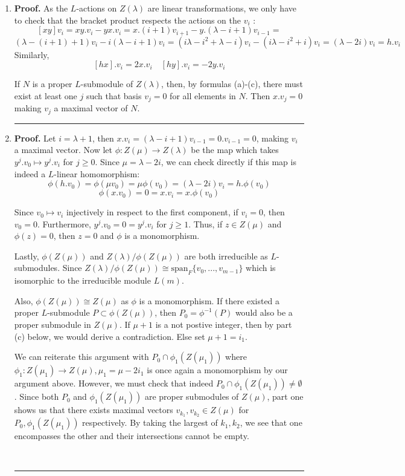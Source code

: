 \documentclass[12pt]{article}%
\newenvironment{proof}[1][Proof]{\textbf{#1.} }{\ \rule{0.5em}{0.5em}}
\begin{document}
\begin{enumerate}
  \item
  \begin{proof}
  As the $L$-actions on $Z(\lambda)$ are linear transformations, we only have to check that the bracket product respects the actions on the $v_i$ :
    $$
      [xy]v_i = xy.v_i - yx.v_i = x.(i+1)v_{i+1} - y.(\lambda - i + 1)v_{i-1} =  $$  $$
      (\lambda - (i+1) + 1)v_i - i(\lambda - i + 1)v_i = (i\lambda - i^2 + \lambda - i)v_i - (i\lambda - i^2 + i)v_i = (\lambda - 2i)v_i = h.v_i $$
    Similarly,
    $$ [hx].v_i = 2x.v_i \quad [hy].v_i = -2y.v_i $$

    If $N$ is a proper $L$-submodule of $Z(\lambda)$, then, by formulas (a)-(c), there must exist at least one $j$ such that basis $v_j = 0$ for all elements in $N$. Then $x.v_j = 0$ making $v_j$ a maximal vector of $N$.
  \end{proof}
  \item
  \begin{proof}
    Let $i = \lambda + 1$, then $x.v_i = (\lambda - i + 1)v_{i-1} = 0.v_{i-1} = 0$, making $v_i$ a maximal vector. Now let $\phi:Z(\mu) \rightarrow Z(\lambda)$ be the map which takes $y^j.v_0 \mapsto y^j.v_i$ for $j \geq 0$. Since $\mu = \lambda - 2i$, we can check directly if this map is indeed a $L$-linear homomorphism:
    $$\phi(h.v_0) = \phi(\mu v_0) = \mu \phi(v_0) = (\lambda - 2i)v_i = h.\phi(v_0) $$
    $$\phi(x.v_0) = 0 = x.v_i = x.\phi(v_0) $$

    Since $v_0 \mapsto v_i$ injectively in respect to the first component, if $v_i = 0$, then $v_0 = 0$. Furthermore, $y^j.v_0 = 0 = y^j.v_i$ for $j \geq 1$. Thus, if $z \in Z(\mu)$ and $\phi(z) = 0$, then $z = 0$ and $\phi$ is a monomorphism.

    Lastly, $\phi(Z(\mu))$ and $Z(\lambda)/\phi(Z(\mu))$ are both irreducible as $L$-submodules. Since $Z(\lambda)/\phi(Z(\mu)) \cong \text{span}_F\{v_0,...,v_{m-1}\}$ which is isomorphic to the irreducible module $L(m)$.

    Also, $\phi(Z(\mu)) \cong Z(\mu)$ as $\phi$ is a monomorphism. If there existed a proper $L$-submodule $P \subset \phi(Z(\mu))$, then $P_0 = \phi^{-1}(P)$ would also be a proper submodule in $Z(\mu)$. If $\mu + 1$ is a not postive integer, then by part (c) below, we would derive a contradiction. Else set $\mu+1 = i_1$.

    We can reiterate this argument with $P_0 \cap \phi_1(Z(\mu_1))$ where $\phi_1: Z(\mu_1) \rightarrow Z(\mu),\mu_1 = \mu - 2i_1$ is once again a monomorphism by our argument above. However, we must check that indeed $P_0 \cap \phi_1(Z(\mu_1)) \neq \emptyset$. Since both $P_0$ and $\phi_1(Z(\mu_1))$ are proper submodules of $Z(\mu)$, part one shows us that there exists maximal vectors $v_{k_1},v_{k_2} \in Z(\mu)$ for $P_0,\phi_1(Z(\mu_1))$ respectively. By taking the largest of $k_1,k_2$, we see that one encompasses the other and their intersections cannot be empty.


\end{proof}
\end{enumerate}
\end{document}
